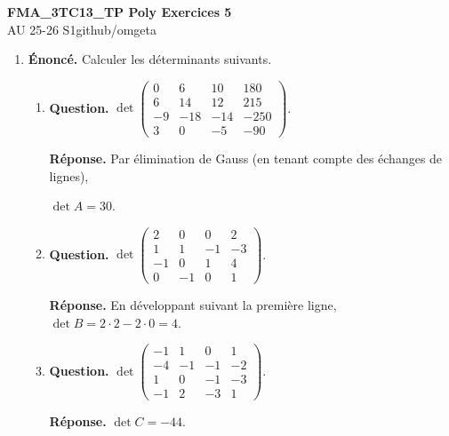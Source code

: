 \documentclass[12pt, a4paper]{article}
\newcommand{\mytitle}{FMA\_3TC13\_TP Poly Exercices 5}
\newcommand{\myauthor}{github/omgeta}
\newcommand{\mydate}{AU 25-26 S1}
\begin{document}
\raggedright
\footnotesize
\begin{center}
{\normalsize{\textbf{\mytitle}}} \\
{\footnotesize{\mydate\hspace{2pt}\textemdash\hspace{2pt}\myauthor}}
\end{center}
\begin{enumerate}[label=5.\arabic*., start=54]

  \item \begin{minipage}[t]{\linewidth}\raggedright
\textbf{Énoncé.} Calculer les déterminants suivants.

\begin{enumerate}[\arabic*.]
        \item \textbf{Question.} $\displaystyle\det\begin{pmatrix}0&6&10&180\\6&14&12&215\\-9&-18&-14&-250\\3&0&-5&-90\end{pmatrix}$.
\par\smallskip
\textbf{Réponse.} Par élimination de Gauss (en tenant compte des échanges de lignes),

$\det A=30$.

  \item \textbf{Question.} $\displaystyle\det\begin{pmatrix}2&0&0&2\\1&1&-1&-3\\-1&0&1&4\\0&-1&0&1\end{pmatrix}$.
\par\smallskip
\textbf{Réponse.} En développant suivant la première ligne, $\det B=2\cdot2-2\cdot0=4$.

  \item \textbf{Question.} $\displaystyle\det\begin{pmatrix}-1&1&0&1\\-4&-1&-1&-2\\1&0&-1&-3\\-1&2&-3&1\end{pmatrix}$.
\par\smallskip
\textbf{Réponse.} $\det C=-44$.


\end{enumerate}
\end{minipage}
\end{enumerate}
\end{document}
